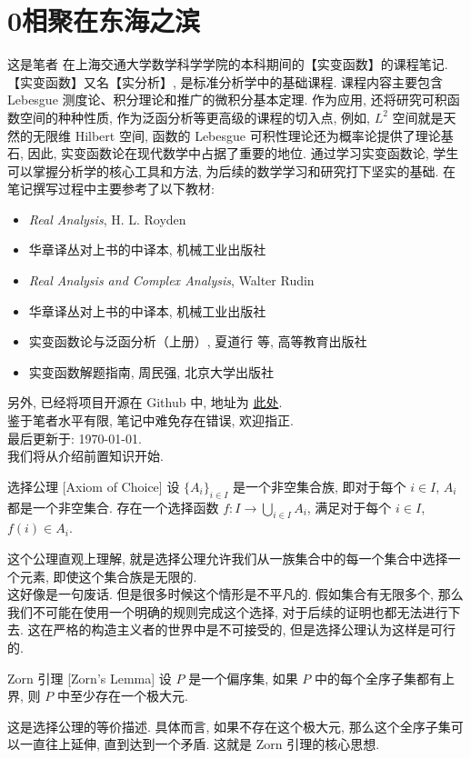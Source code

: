 \def\presectionname{0\quad 相聚在东海之滨}
\section*{\presectionname}
\addcontentsline{toc}{section}{\presectionname}
这是笔者 \Dedicatia{} 在上海交通大学数学科学学院的本科期间的【实变函数】的课程笔记. 
【实变函数】又名【实分析】, 是标准分析学中的基础课程. 课程内容主要包含 Lebesgue 测度论、积分理论和推广的微积分基本定理. 作为应用, 还将研究可积函数空间的种种性质, 作为泛函分析等更高级的课程的切入点, 例如, \(L^2\) 空间就是天然的无限维 Hilbert 空间, 函数的 Lebesgue 可积性理论还为概率论提供了理论基石, 因此, 实变函数论在现代数学中占据了重要的地位. 通过学习实变函数论, 学生可以掌握分析学的核心工具和方法, 为后续的数学学习和研究打下坚实的基础.
在笔记撰写过程中主要参考了以下教材:
\begin{itemize}
    \item \textit{Real Analysis}, H. L. Royden
    \item 华章译丛对上书的中译本, 机械工业出版社
    \item \textit{Real Analysis and Complex Analysis}, Walter Rudin
    \item 华章译丛对上书的中译本, 机械工业出版社
    \item 实变函数论与泛函分析（上册）, 夏道行 等, 高等教育出版社
    \item 实变函数解题指南, 周民强, 北京大学出版社
\end{itemize}
另外, 已经将项目开源在 Github 中, 地址为 \href{https://github.com/Deferria/26-RealAnalysis}{此处}.
\vspace{\baselineskip}\\
{\Large 鉴于笔者水平有限, 笔记中难免存在错误, 欢迎指正.}
\vspace{\baselineskip}\\
\textcolor{darkpurple}{最后更新于: \today.}
\vspace{5em}\\
我们将从介绍前置知识开始.
\begin{thm}
    [AC]
    {选择公理}
    [Axiom of Choice]
    设 \(\{A_i\}_{i\in I}\) 是一个非空集合族, 即对于每个 \(i\in I\), \(A_i\) 都是一个非空集合. 存在一个选择函数 \(f: I \to \bigcup_{i\in I} A_i\), 满足对于每个 \(i\in I\), \(f(i) \in A_i\).
\end{thm}
\begin{rmk}
    这个公理直观上理解, 就是选择公理允许我们从一族集合中的每一个集合中选择一个元素, 即使这个集合族是无限的. \\
    这好像是一句废话. 但是很多时候这个情形是不平凡的. 假如集合有无限多个, 那么我们不可能在使用一个明确的规则完成这个选择, 对于后续的证明也都无法进行下去. 这在严格的构造主义者的世界中是不可接受的, 但是选择公理认为这样是可行的.
\end{rmk}
\begin{crl}
    [Zorn]
    {Zorn 引理}
    [Zorn's Lemma]
    设 \(P\) 是一个偏序集, 如果 \(P\) 中的每个全序子集都有上界, 则 \(P\) 中至少存在一个极大元.
\end{crl}
\begin{rmk}
    这是选择公理的等价描述. 具体而言, 如果不存在这个极大元, 那么这个全序子集可以一直往上延伸, 直到达到一个矛盾. 这就是 Zorn 引理的核心思想.
\end{rmk}
\continued
